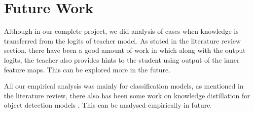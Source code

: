 \documentclass{article} %
\begin{document}
	\section{Future Work}
	Although in our complete project, we did analysis of cases when knowledge is transferred from the logits of teacher model. As stated in the literature review section, there have been a good amount of work in which along with the output logits, the teacher also provides hints to the student using output of the inner feature maps. This can be explored more in the future.
	
	All our empirical analysis was mainly for classification models, as mentioned in the literature review, there also has been some work on knowledge distillation for object detection models \cite{NIPS2017_e1e32e23} . This can be analysed empirically in future.
	
	
	
	
	
	
\end{document}
